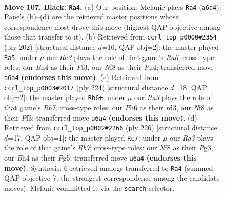 \documentclass[11pt]{article}
\begin{document}
\clearpage

\begin{figure}[p]\centering
\begin{subfigure}{0.46\textwidth}\centering
\resizebox{\linewidth}{!}{%
\newchessgame
\chessboard[
  setfen={5n2/2R5/r6p/4p3/6kb/3p4/1K6/8 b - - 11 107},
  showmover=false,
  pgfstyle=straightmove, color=movearrow, markmove={a6-a4}
]}
\caption{}
\end{subfigure}\hfill
\begin{subfigure}{0.46\textwidth}\centering
\resizebox{\linewidth}{!}{%
\newchessgame
\chessboard[
  setfen={2r5/6k1/R7/7p/7P/5P2/5K2/8 w - - 15 102},
  showmover=false,
  pgfstyle=straightmove, color=movearrow, markmove={a6-a5}
]}
\caption{}
\end{subfigure}
\\[4pt]
\begin{subfigure}{0.46\textwidth}\centering
\resizebox{\linewidth}{!}{%
\newchessgame
\chessboard[
  setfen={8/1R6/6k1/4p3/8/3r1PPK/8/8 w - - 37 113},
  showmover=false,
  pgfstyle=straightmove, color=movearrow, markmove={b7-b6}
]}
\caption{}
\end{subfigure}\hfill
\begin{subfigure}{0.46\textwidth}\centering
\resizebox{\linewidth}{!}{%
\newchessgame
\chessboard[
  setfen={5k2/1R6/r7/6PK/8/6P1/8/8 w - - 23 114},
  showmover=false,
  pgfstyle=straightmove, color=movearrow, markmove={b7-c7}
]}
\caption{}
\end{subfigure}
\caption{\textbf{Move 107, Black: \texttt{Ra4}.} (a) Our position; Melanie plays \texttt{Ra4} (\texttt{a6a4}). Panels (b)--(d) are the retrieved master positions whose correspondence most drove this move (highest QAP objective among those that transfer to it). (b) Retrieved from \texttt{ccrl\_top\_p0000\#2354} (ply 202) [structural distance $d$=16, QAP obj=2]: the master played \texttt{Ra5}; under $\mu$ our \emph{Ra3} plays the role of that game's \emph{Ra6}; cross-type roles: our \emph{B}h4 as their \emph{P}f3, our \emph{N}f8 as their \emph{P}h4; transferred move \texttt{a6a4} \textbf{(endorses this move)}. (c) Retrieved from \texttt{ccrl\_top\_p0003\#2017} (ply 224) [structural distance $d$=18, QAP obj=2]: the master played \texttt{Rb6+}; under $\mu$ our \emph{Ra3} plays the role of that game's \emph{Rb7}; cross-type roles: our \emph{P}h6 as their \emph{r}d3, our \emph{N}f8 as their \emph{P}f3; transferred move \texttt{a6a4} \textbf{(endorses this move)}. (d) Retrieved from \texttt{ccrl\_top\_p0002\#2266} (ply 226) [structural distance $d$=17, QAP obj=1]: the master played \texttt{Rc7}; under $\mu$ our \emph{Ra3} plays the role of that game's \emph{Rb7}; cross-type roles: our \emph{N}f8 as their \emph{P}g3, our \emph{B}h4 as their \emph{P}g5; transferred move \texttt{a6a4} \textbf{(endorses this move)}. Synthesis: 6 retrieved analogs transferred to \texttt{Ra4} (summed QAP objective 7, the strongest correspondence among the candidate moves); Melanie committed it via the \texttt{search} selector.}
\label{fig:thought-m213}
\end{figure}
\end{document}
